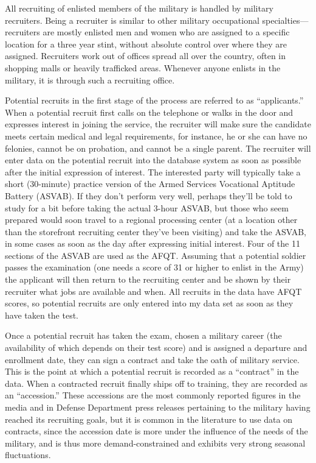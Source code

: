 \documentclass[12pt] {article}
\begin{document}
All recruiting of enlisted members of the military is handled by military
recruiters. Being a recruiter is similar to other military occupational
specialties---recruiters are mostly enlisted men and women who are
assigned to a specific location for a three year stint, without absolute
control over where they are assigned. Recruiters work out of offices
spread all over the country, often in shopping malls or heavily trafficked
areas. Whenever anyone enlists in the military, it is through such
a recruiting office.

Potential recruits in the first stage of the process are referred
to as {}``applicants.'' When a potential recruit first calls on
the telephone or walks in the door and expresses interest in joining
the service, the recruiter will make sure the candidate meets certain
medical and legal requirements, for instance, he or she can have no
felonies, cannot be on probation, and cannot be a single parent. The
recruiter will enter data on the potential recruit into the database
system as soon as possible after the initial expression of interest.
The interested party will typically take a short (30-minute) practice
version of the Armed Services Vocational Aptitude Battery (ASVAB).
If they don't perform very well, perhaps they'll be told to study
for a bit before taking the actual 3-hour ASVAB, but those who seem
prepared would soon travel to a regional processing center (at a location
other than the storefront recruiting center they've been visiting)
and take the ASVAB, in some cases as soon as the day after expressing
initial interest. Four of the 11 sections of the ASVAB are used as
the AFQT. Assuming that a potential soldier passes the examination
(one needs a score of 31 or higher to enlist in the Army) the applicant will
then return to the recruiting center and be shown by their recruiter
what jobs are available and when. All recruits in the data have AFQT scores, so potential recruits are only entered into
my data set as soon as they have taken the test.

Once a potential recruit has taken the exam, chosen a military career
(the availability of which depends on their test score) and is assigned
a departure and enrollment date, they can sign a contract and take
the oath of military service. This is the point at which a potential
recruit is recorded as a {}``contract'' in the data. When a contracted
recruit finally ships off to training, they are recorded as an {}``accession.''
These accessions are the most commonly reported figures in the media
and in Defense Department press releases pertaining to the military
having reached its recruiting goals, but it is common in the literature
to use data on contracts, since the accession date is more under the
influence of the needs of the military, and is thus more demand-constrained
and exhibits very strong seasonal fluctuations.
\end{document}
